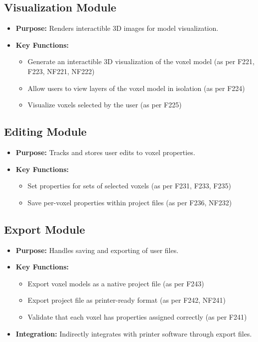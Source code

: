 \documentclass{article}
\begin{document}
\subsection{Visualization Module}
\begin{itemize}
    \item \textbf{Purpose:} Renders interactible 3D images for model visualization.
    \item \textbf{Key Functions:} 
    \begin{itemize}
        \item Generate an interactible 3D visualization of the voxel model (as per F221, F223, NF221, NF222)
        \item Allow users to view layers of the voxel model in isolation (as per F224)
        \item Visualize voxels selected by the user (as per F225)
    \end{itemize}
\end{itemize}

\subsection{Editing Module}
\begin{itemize}
    \item \textbf{Purpose:} Tracks and stores user edits to voxel properties.
    \item \textbf{Key Functions:} 
    \begin{itemize}
        \item Set properties for sets of selected voxels (as per F231, F233, F235)
        \item Save per-voxel properties within project files (as per F236, NF232)
    \end{itemize}
\end{itemize}

\subsection{Export Module}
\begin{itemize}
    \item \textbf{Purpose:} Handles saving and exporting of user files.
    \item \textbf{Key Functions:} 
    \begin{itemize}
        \item Export voxel models as a native project file (as per F243)
        \item Export project file as printer-ready format (as per F242, NF241)
        \item Validate that each voxel has properties assigned correctly (as per F241)
    \end{itemize}
    \item \textbf{Integration:} Indirectly integrates with printer software through export files.
\end{itemize}
\end{document}
